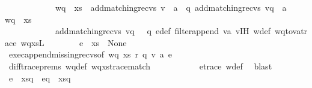 \begin{isabellebody}
\ \ \ \ \ \ \ \ \ \ \ \ {\isacartoucheopen}{\isacharparenleft}{\kern0pt}{\isacharparenleft}{\kern0pt}wq\ {\isasymsqdot}\ xs{\isacharparenright}{\kern0pt}{\isasymdown}\isactrlsub {\isacharquery}{\kern0pt}{\isacharparenright}{\kern0pt}\ {\isacharequal}{\kern0pt}\ {\isacharparenleft}{\kern0pt}{\isacharparenleft}{\kern0pt}add{\isacharunderscore}{\kern0pt}matching{\isacharunderscore}{\kern0pt}recvs\ v\ {\isasymsqdot}\ a\ {\isacharhash}{\kern0pt}\ {\isasymepsilon}{\isacharparenright}{\kern0pt}{\isasymdown}\isactrlsub q{\isacharparenright}{\kern0pt}{\isasymdown}\isactrlsub {\isacharquery}{\kern0pt}{\isacartoucheclose}\ {\isacartoucheopen}add{\isacharunderscore}{\kern0pt}matching{\isacharunderscore}{\kern0pt}recvs\ v{\isasymdown}\isactrlsub q\ {\isasymsqdot}\ a\ {\isacharhash}{\kern0pt}\ {\isasymepsilon}\ {\isasymnoteq}\ wq\ {\isasymsqdot}\ xs{\isacartoucheclose}\isanewline
\ \ \ \ \ \ \ \ \ \ \ \ {\isacartoucheopen}add{\isacharunderscore}{\kern0pt}matching{\isacharunderscore}{\kern0pt}recvs\ v{\isasymdown}\isactrlsub q\ {\isasymin}\ {\isasymL}\isactrlsup {\isacharasterisk}{\kern0pt}\ q{\isacartoucheclose}\ e{\isacharunderscore}{\kern0pt}def\ filter{\isacharunderscore}{\kern0pt}append\ v{\isacharprime}{\kern0pt}a{}\ v{\isacharunderscore}{\kern0pt}IH\ w{\isacharunderscore}{\kern0pt}def\ wq{\isacharunderscore}{\kern0pt}to{\isacharunderscore}{\kern0pt}v{\isacharprime}{\kern0pt}a{\isacharunderscore}{\kern0pt}trace\ wqxs{\isacharunderscore}{\kern0pt}L{\isacharparenright}{\kern0pt}\isanewline
\isanewline
\ \ \ \ \ \ \isamarkupfalse%
\ {\isachardoublequoteopen}{\isacharparenleft}{\kern0pt}e\ {\isasymsqdot}\ xs{\isacharparenright}{\kern0pt}\ {\isasymin}\ {\isasymT}\isactrlbsub None\isactrlesub {\isachardoublequoteclose}\ \isamarkupfalse%
\ exec{\isacharunderscore}{\kern0pt}append{\isacharunderscore}{\kern0pt}missing{\isacharunderscore}{\kern0pt}recvs{\isacharbrackleft}{\kern0pt}of\ wq\ xs\ r\ q\ v\ a\ e{\isacharbrackright}{\kern0pt}\ \ \isamarkupfalse%
\ diff{\isacharunderscore}{\kern0pt}trace{\isacharunderscore}{\kern0pt}prems\ wq{\isacharunderscore}{\kern0pt}def\ wqxs{\isacharunderscore}{\kern0pt}trace{\isacharunderscore}{\kern0pt}match\ \isanewline
\ \ \ \ \ \ \ \ \ \ e{\isacharunderscore}{\kern0pt}trace\ w{\isacharunderscore}{\kern0pt}def\ \isamarkupfalse%
\ blast\isanewline
\ \ \ \ \ \ \isamarkupfalse%
\ {\isachardoublequoteopen}{\isacharparenleft}{\kern0pt}e\ {\isasymsqdot}\ xs{\isacharparenright}{\kern0pt}{\isasymdown}\isactrlsub q\ {\isacharequal}{\kern0pt}\ e{\isasymdown}\isactrlsub q\ {\isasymsqdot}\ xs{\isasymdown}\isactrlsub q{\isachardoublequoteclose}\ \isamarkupfalse%

\end{isabellebody}

